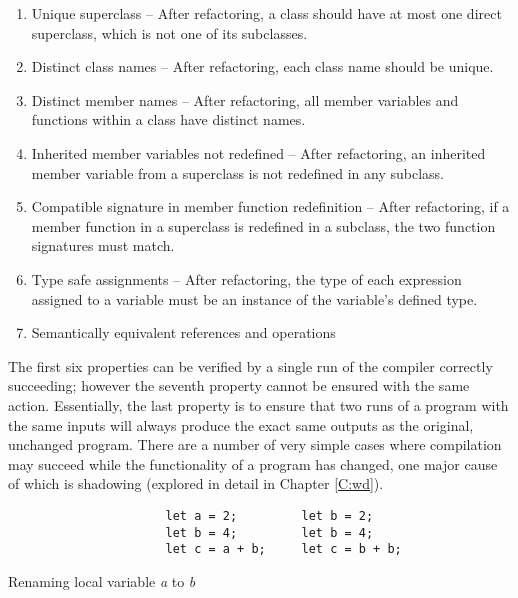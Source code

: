 \begin{enumerate}
\item Unique superclass -- After refactoring, a class should have at most one direct superclass, which is not one of its subclasses.
\item Distinct class names -- After refactoring, each class name should be unique.
\item Distinct member names --  After refactoring, all member variables and functions within a class have distinct names.
\item Inherited member variables not redefined -- After refactoring, an inherited member variable from a superclass is not redefined in any subclass.
\item Compatible signature in member function redefinition -- After refactoring, if a member function in a superclass is redefined in a subclass, the two function signatures must match.
\item Type safe assignments -- After refactoring, the type of each expression assigned to a variable must be an instance of the variable's defined type.
\item Semantically equivalent references and operations
\end{enumerate}

The first six properties can be verified by a single run of the compiler correctly succeeding; however the seventh property cannot be ensured with the same action. Essentially, the last property is to ensure that two runs of a program with the same inputs will always produce the exact same outputs as the original, unchanged program. There are a number of very simple cases where compilation may succeed while the functionality of a program has changed, one major cause of which is shadowing (explored in detail in Chapter \ref{C:wd}). 

\begin{fig}
\begin{verbatim}
                      let a = 2;         let b = 2;
                      let b = 4;         let b = 4;
                      let c = a + b;     let c = b + b;
\end{verbatim}
\caption{Renaming local variable \emph{a} to \emph{b}}
\label{Fig:opdyke}
\end{fig}

